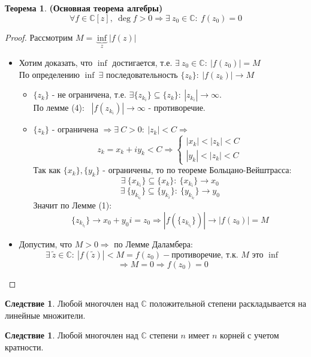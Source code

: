 \documentclass[a4paper, 12pt]{article}
\newcounter{concount}
\theoremstyle{definition}
\newtheorem*{theorem}{Теорема}
\newtheorem{consequensenum}[concount]{Следствие}
\begin{document}
  \begin{theorem} \textbf{(Основная теорема алгебры)} 
    $$\forall f \in \mathbb{C}[z], \ \deg f >0 \Longrightarrow  \exists \ z_0 \in \mathbb{C}: \ f(z_0) = 0$$
  \end{theorem}
  \begin{proof}
    Рассмотрим $M = \underbrace{\inf}_{z} |f(z)|$
    \begin{itemize}
      \item[\textit{1 шаг.}] Хотим доказать, что $\inf$ достигается, т.е. $\exists \ z_0 \in \mathbb{C}: \ |f(z_0)| = M$\\
      По определению $\inf \ \exists$ последовательность $\{z_k\}: \ |f(z_k)| \to M$
      \begin{itemize}
        \item[1 случай.] $\{z_k\}$  - не ограничена, т.е. $\exists  \{z_{k_i}\}\subseteq \{z_k\}: \ |z_{k_i}| \to \infty$. \\
        По лемме (4): \ $|f(z_{k_i})| \to \infty$ - противоречие. 
        \item[2 случай.] $\{z_k\}$ - ограничена $\Longrightarrow \exists \ C > 0: \ |z_k | < C \Longrightarrow$   
        $$z_k = x_k + iy_k < C \Longrightarrow \begin{cases}
          |x_k|<|z_k|<C \\
          |y_k|<|z_k|<C
        \end{cases}$$
        Так как $\{x_k\}, \{y_k\}$ - ограничены, то по теореме Больцано-Вейштрасса:
        $$\exists \ \{x_{k_{i}}\}\subseteq \{x_{k}\}: \ \{x_{k_{i}}\} \to x_0$$
        $$\exists \ \{y_{k_{i_l}}\}\subseteq \{y_{k_{i}}\}: \ \{y_{k_{i_l}}\} \to y_0$$
        Значит по Лемме (1):
        $$\{z_{k_{i_l}}\} \to x_0 + y_0i = z_0 \Longrightarrow |f(\{z_{k_{i_l}}\})| \to |f(z_0)| = M$$  
      \end{itemize}
      \item[\textit{2 шаг.}] Допустим, что $M>0 \Longrightarrow$ по Лемме Даламбера:
      $$\exists \ \widetilde{z} \in \mathbb{C}: \ |f(\widetilde{z})|<M = f(z_0) - \text{противоречие, т.к. } M \text{ это } \inf $$
      $$\Longrightarrow M=0 \Longrightarrow f(z_0) =0$$  
    \end{itemize}
  \end{proof} 
  \begin{consequensenum}
    Любой многочлен над $\mathbb{C}$ положительной степени раскладывается на линейные множители. 
  \end{consequensenum}
  \begin{consequensenum}
    Любой многочлен над $\mathbb{C}$ степени $n$ имеет $n$ корней с учетом кратности. 
  \end{consequensenum} 
\end{document}
